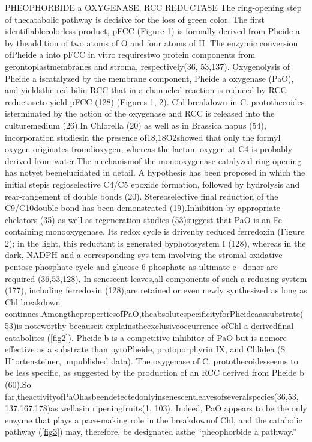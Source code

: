\documentclass[a4paper, twocolumn, 11pt]{article}
\begin{document}
	PHEOPHORBIDE a OXYGENASE, RCC REDUCTASE The ring-opening step of thecatabolic pathway is decisive for the loss of green color. The ﬁrst identiﬁablecolorless product, pFCC (Figure 1) is formally derived from Pheide a by theaddition of two atoms of O and four atoms of H. The enzymic conversion ofPheide a into pFCC in vitro requirestwo protein components from gerontoplastmembranes and stroma, respectively(36, 53,137). Oxygenolysis of Pheide a iscatalyzed by the membrane component, Pheide a oxygenase (PaO), and yieldsthe red bilin RCC that in a channeled reaction is reduced by RCC reductaseto yield pFCC (128) (Figures 1, 2). Chl breakdown in C. protothecoides isterminated by the action of the oxygenase and RCC is released into the culturemedium (26).In Chlorella (20) as well as in Brassica napus (54), incorporation studiesin the presence of18,18O2showed that only the formyl oxygen originates fromdioxygen, whereas the lactam oxygen at C4 is probably derived from water.The mechanismof the monooxygenase-catalyzed ring opening has notyet beenelucidated in detail. A hypothesis has been proposed in which the initial stepis regioselective C4/C5 epoxide formation, followed by hydrolysis and rear-rangement of double bonds (20). Stereoselective ﬁnal reduction of the C9/C10double bond has been demonstrated (19).Inhibition by appropriate chelators (35) as well as regeneration studies (53)suggest that PaO is an Fe-containing monooxygenase. Its redox cycle is drivenby reduced ferredoxin (Figure 2); in the light, this reductant is generated byphotosystem I (128), whereas in the dark, NADPH and a corresponding sys-tem involving the stromal oxidative pentose-phosphate-cycle and glucose-6-phosphate as ultimate e−donor are required (36,53,128). In senescent leaves,all components of such a reducing system (177), including ferredoxin (128),are retained or even newly synthesized as long as Chl breakdown continues.AmongthepropertiesofPaO,theabsolutespeciﬁcityforPheideaassubstrate(53)is noteworthy becauseit explainstheexclusiveoccurrence ofChl a-derivedﬁnal catabolites (\ref{fig2}). Pheide b is a competitive inhibitor of PaO but is nomore effective as a substrate than pyroPheide, protoporphyrin IX, and Chlidea (S H¨ortensteiner, unpublished data). The oxygenase of C. protothecoidesseems to be less speciﬁc, as suggested by the production of an RCC derived from Pheide b (60).So far,theactivityofPaOhasbeendetectedonlyinsenescentleavesofseveralspecies(36,53, 137,167,178)as wellasin ripeningfruits(1, 103). Indeed, PaO appears to be the only enzyme that plays a pace-making role in the breakdownof Chl, and the catabolic pathway (\ref{fig3}) may, therefore, be designated asthe “pheophorbide a pathway.”\\
\end{document}
